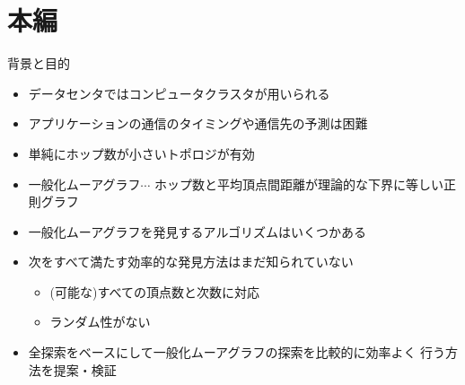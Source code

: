 
\begin{frame}
  \maketitle
\end{frame}

\section{本編}
\begin{frame}{背景と目的}
  \begin{itemize}
  \item データセンタではコンピュータクラスタが用いられる
  \item アプリケーションの通信のタイミングや通信先の予測は困難
  \item 単純にホップ数が小さいトポロジが有効\cite{Koibuchi2012, Singla2011}
  \item \alert{一般化ムーアグラフ}$\cdots$
    ホップ数と平均頂点間距離が理論的な下界に等しい正則グラフ
    \cite{cerf1973computer, Cerf1974}
  \item 一般化ムーアグラフを発見するアルゴリズムはいくつかある
    \cite{Sampels2004, Fujita2015, Yamamoto2016}
  \item 次をすべて満たす効率的な発見方法はまだ知られていない
    \begin{itemize}
    \item (可能な)すべての頂点数と次数に対応
    \item ランダム性がない
    \end{itemize}
  \item 全探索をベースにして一般化ムーアグラフの探索を比較的に効率よく
    行う方法を提案・検証
  \end{itemize}
\end{frame}

